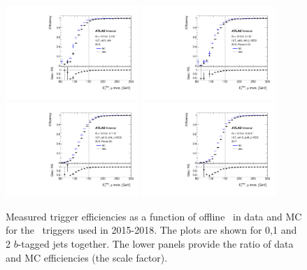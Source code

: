 \begin{figure}[tb!]
	\centering
	\includegraphics[width=0.45\textwidth]{chapters/c6/figures/METTriggerCalibration/efficiecy_HLT_xe70_mht.pdf}
	\includegraphics[width=0.45\textwidth]{chapters/c6/figures/METTriggerCalibration/efficiecy_HLT_xe90_mht_L1XE50.pdf}
	\includegraphics[width=0.45\textwidth]{chapters/c6/figures/METTriggerCalibration/efficiecy_HLT_xe110_mht_L1XE50.pdf}
	\includegraphics[width=0.45\textwidth]{chapters/c6/figures/METTriggerCalibration/efficiecy_HLT_xe110_pufit_L1XE55.pdf}
	\caption{Measured trigger efficiencies as a function of offline \METnomu~in data and MC for the \MET~triggers used in 2015-2018. The plots are shown for 0,1 and 2 $b$-tagged jets together. The lower panels provide the ratio of data and MC efficiencies (the scale factor).}
	\label{fig:TrigEff}
\end{figure}

